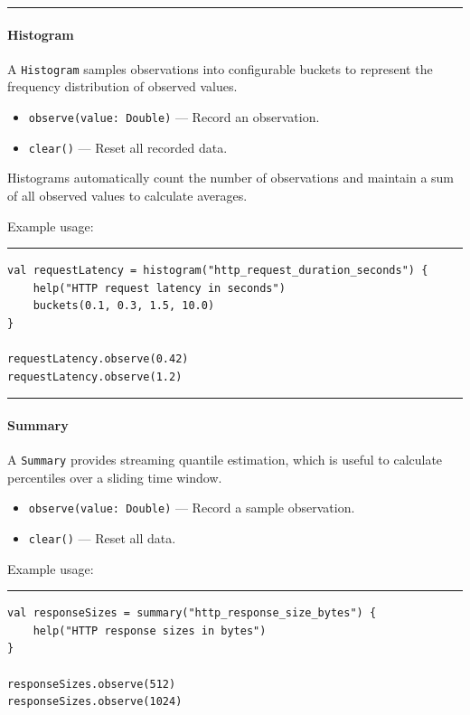 \noindent\rule{\linewidth}{0.4pt}


\paragraph{Histogram}

A \texttt{Histogram} samples observations into configurable buckets to represent the frequency distribution of observed values.

\begin{itemize}
    \item \texttt{observe(value: Double)} — Record an observation.
    \item \texttt{clear()} — Reset all recorded data.
\end{itemize}

Histograms automatically count the number of observations and maintain a sum of all observed values to calculate averages.

Example usage:

\noindent\rule{\linewidth}{0.4pt}

\begin{lstlisting}
val requestLatency = histogram("http_request_duration_seconds") {
    help("HTTP request latency in seconds")
    buckets(0.1, 0.3, 1.5, 10.0)
}

requestLatency.observe(0.42)
requestLatency.observe(1.2)
\end{lstlisting}

\noindent\rule{\linewidth}{0.4pt}


\paragraph{Summary}

A \texttt{Summary} provides streaming quantile estimation, which is useful to calculate percentiles over a sliding time window.

\begin{itemize}
    \item \texttt{observe(value: Double)} — Record a sample observation.
    \item \texttt{clear()} — Reset all data.
\end{itemize}

Example usage:

\noindent\rule{\linewidth}{0.4pt}

\begin{lstlisting}
val responseSizes = summary("http_response_size_bytes") {
    help("HTTP response sizes in bytes")
}

responseSizes.observe(512)
responseSizes.observe(1024)
\end{lstlisting}

